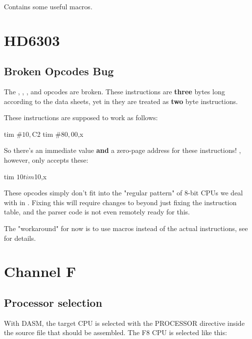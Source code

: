 \subsubsection{}
\label{support6502}

Contains some useful macros.

\section{HD6303}

\subsection{Broken Opcodes Bug}
\label{changelog:20200903bug}
The , , , and  opcodes are broken. These instructions are \textbf{three} bytes long according to the data sheets, yet in \dasm they are
treated as \textbf{two} byte instructions.

These instructions are supposed
to work as follows:

\begin{code}
	tim	#$10,$C2
	tim	#$80,$00,x
\end{code}

So there's an immediate value \textbf{and} a zero-page address
for these instructions! \dasm, however, only accepts these:

\begin{code}
	tim	$10
	tim	$10,x
\end{code}

These opcodes simply don't fit into the "regular pattern" of 8-bit CPUs
we deal with in \dasm. Fixing this will require changes to
\dasm beyond just fixing the instruction table, and the parser code is not even remotely ready for this.

The "workaround" for now is to use macros instead of the
actual instructions, see  for
details.


\section{Channel F}
\label{changelog:20200906f8}

\subsection{Processor selection}

With DASM, the target CPU is selected with the PROCESSOR
directive inside the source file that should be assembled.
The F8 CPU is selected like this:

